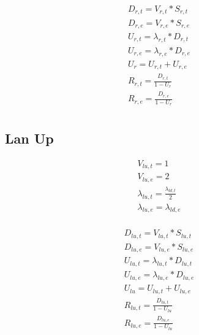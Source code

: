 \documentclass[11pt]{article}
\begin{document}
\begin{equation}
    \begin{array}{l}
        D_{r, t} = V_{r, t} * S_{r, t} \\
        D_{r, e} = V_{r, e} * S_{r, e} \\
        U_{r, t} = \lambda_{r, t} * D_{r, t} \\
        U_{r, e} = \lambda_{r, e} * D_{r, e} \\
        U_{r} = U_{r, t} + U_{r, e} \\
        R_{r, t} = \frac{D_{r, t}}{1 - U_{r}} \\
        R_{r, e} = \frac{D_{r, e}}{1 - U_{r}} \\
    \end{array}
\end{equation}

\subsection{Lan Up}

\begin{equation}
    \begin{array}{l}
        V_{lu, t} = 1 \\
        V_{lu, e} = 2 \\ %
        \lambda_{lu, t} = \frac{\lambda_{ld, t}}{2} \\ %
        \lambda_{lu, e} = \lambda_{ld, e} \\
    \end{array}
\end{equation}

\begin{equation}
    \begin{array}{l}
        D_{lu, t} = V_{lu, t} * S_{lu, t} \\
        D_{lu, e} = V_{lu, e} * S_{lu, e} \\
        U_{lu, t} = \lambda_{lu, t} * D_{lu, t} \\
        U_{lu, e} = \lambda_{lu, e} * D_{lu, e} \\
        U_{lu} = U_{lu, t} + U_{lu, e} \\
        R_{lu, t} = \frac{D_{lu, t}}{1 - U_{lu}} \\
        R_{lu, e} = \frac{D_{lu, e}}{1 - U_{lu}} \\
    \end{array}
\end{equation}
\end{document}
